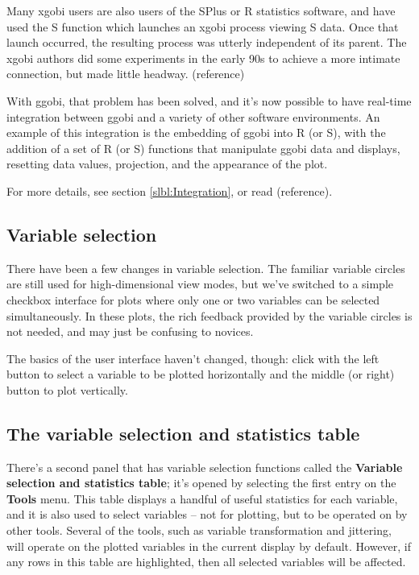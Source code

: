 \documentclass[11pt]{article}
\begin{document}
Many xgobi users are also users of the SPlus or R statistics
software, and have used the S function which launches an xgobi
process viewing S data.  Once that launch occurred, the resulting
process was utterly independent of its parent.  The xgobi authors
did some experiments in the early 90s to achieve a more intimate
connection, but made little headway.  (reference)

With ggobi, that problem has been solved, and it's now possible
to have real-time integration between ggobi and a variety of
other software environments.  An example of this integration is
the embedding of ggobi into R (or S), with the addition of a set of
R (or S) functions that manipulate ggobi data and displays,
resetting data values, projection, and the appearance of the plot.

For more details, see section \ref{slbl:Integration}, or read
(reference).

\subsection {Variable selection}

There have been a few changes in variable selection.  The
familiar variable circles are still used for high-dimensional
view modes, but we've switched to a simple checkbox interface
for plots where only one or two variables can be selected
simultaneously.  In these plots, the rich feedback provided
by the variable circles is not needed, and may just be confusing
to novices.

The basics of the user interface haven't changed, though:
click with the left button to select a variable to be plotted
horizontally and the middle (or right) button to plot vertically.

\subsection {The variable selection and statistics table}

There's a second panel that has variable selection functions called
the {\bf Variable selection and statistics table}; it's opened by
selecting the first entry on the {\bf Tools} menu.  This table
displays a handful of useful statistics for each variable, and it is
also used to select variables -- not for plotting, but to be operated
on by other tools.  Several of the tools, such as variable
transformation and jittering, will operate on the plotted variables
in the current display by default.  However, if any rows in this
table are highlighted, then all selected variables will be affected.
\end{document}
